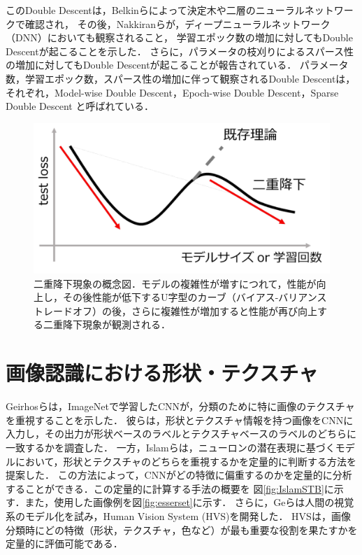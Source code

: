 このDouble Descentは，Belkinら\cite{Belkin_2019}によって決定木や二層のニューラルネットワークで確認され，
その後，Nakkiranら\cite{Nakkiran2021}が，ディープニューラルネットワーク（DNN）においても観察されること，
学習エポック数の増加に対してもDouble Descentが起こることを示した．
さらに，パラメータの枝刈りによるスパース性の増加に対してもDouble Descentが起こることが報告されている\cite{He2016-et}．
パラメータ数，学習エポック数，スパース性の増加に伴って観察されるDouble Descentは，
それぞれ，Model-wise Double Descent，Epoch-wise Double Descent，Sparse Double Descent と呼ばれている\cite{Nakkiran2021, He2016-et}．

\begin{figure}[h]
    \centering
    \includegraphics[width=\linewidth]{fig/doubledescent.pdf}
    \caption[二重降下現象の概念図]{二重降下現象の概念図．モデルの複雑性が増すにつれて，性能が向上し，その後性能が低下するU字型のカーブ（バイアス-バリアンス トレードオフ）の後，さらに複雑性が増加すると性能が再び向上する二重降下現象が観測される．}
    \label{fig:DoubleDescent}
\end{figure}

\section{画像認識における形状・テクスチャ}
Geirhosらは，ImageNetで学習したCNNが，分類のために特に画像のテクスチャを重視することを示した\cite{Geirhos}．
彼らは，形状とテクスチャ情報を持つ画像をCNNに入力し，その出力が形状ベースのラベルとテクスチャベースのラベルのどちらに一致するかを調査した．
一方，Islamらは，ニューロンの潜在表現に基づくモデルにおいて，形状とテクスチャのどちらを重視するかを定量的に判断する方法を提案した\cite{}．
この方法によって，CNNがどの特徴に偏重するのかを定量的に分析することができる．この定量的に計算する手法の概要を
図\ref{fig:IslamSTB}に示す．また，使用した画像例を図\ref{fig:esserset}に示す．
さらに，Geらは人間の視覚系のモデル化を試み，Human Vision System (HVS)を開発した．
HVSは，画像分類時にどの特徴（形状，テクスチャ，色など）が最も重要な役割を果たすかを定量的に評価可能である\cite{Ge}．

